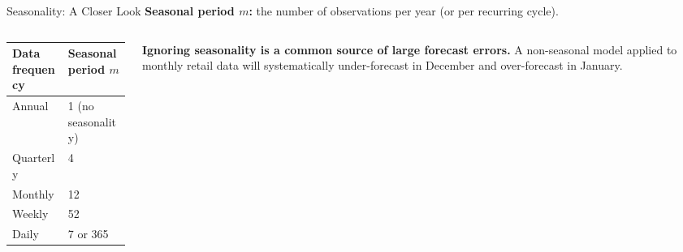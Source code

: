 \documentclass[aspectratio=169, 11pt]{beamer}
\begin{document}
\begin{frame}{Seasonality: A Closer Look}
  \textbf{Seasonal period $m$:} the number of observations per year
  (or per recurring cycle).

  \vspace{0.3cm}
  \begin{columns}[T]
    \begin{column}{0.48\textwidth}
      \begin{tabular}{ll}
        \toprule
        Data frequency & Seasonal period $m$ \\
        \midrule
        Annual         & 1 (no seasonality) \\
        Quarterly      & 4 \\
        Monthly        & 12 \\
        Weekly         & 52 \\
        Daily          & 7 or 365 \\
        \bottomrule
      \end{tabular}
    \end{column}
    \begin{column}{0.48\textwidth}
      \begin{warningbox}
        \textbf{Ignoring seasonality is a common source of large forecast errors.}
        A non-seasonal model applied to monthly retail data will systematically
        under-forecast in December and over-forecast in January.
      \end{warningbox}
    \end{column}
  \end{columns}
  \vspace{0.3cm}
\end{frame}
\end{document}
